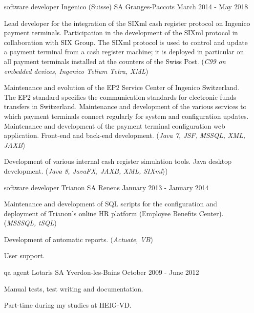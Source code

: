 \begin{cventries}
\cventry
{software developer} %
{Ingenico (Suisse) SA} %
{Granges-Paccots} %
{March 2014 - May 2018} %
{ %
\begin{cvitems}
\item {Lead developer for the integration of the SIXml cash register protocol on Ingenico payment terminals. Participation in the development of the SIXml protocol in collaboration with SIX Group. The SIXml protocol is used to control and update a payment terminal from a cash register machine; it is deployed in particular on all payment terminals installed at the counters of the Swiss Post. (\emph{C99 on embedded devices, Ingenico Telium Tetra, XML})}
\item {Maintenance and evolution of the EP2 Service Center of Ingenico Switzerland. The EP2 standard specifies the communication standards for electronic funds transfers in Switzerland. Maintenance and development of the various services to which payment terminals connect regularly for system and configuration updates. Maintenance and development of the payment terminal configuration web application. Front-end and back-end development. (\emph{Java 7, JSF, MSSQL, XML, JAXB})}
\item {Development of various internal cash register simulation tools. Java desktop development. (\emph{Java 8, JavaFX, JAXB, XML, SIXml}))}
\end{cvitems}
}


\cventry
{software developer} %
{Trianon SA} %
{Renens} %
{January 2013 - January 2014} %
{ %
\begin{cvitems}
\item {Maintenance and development of SQL scripts for the configuration and deployment of Trianon's online HR platform (Employee Benefits Center). (\emph{MSSSQL, tSQL})}
\item {Development of automatic reports. (\emph{Actuate, VB})}
\item {User support.}
\end{cvitems} 
}


\cventry
{qa agent} %
{Lotaris SA} %
{Yverdon-les-Bains} %
{October 2009 - June 2012} %
{ %
\begin{cvitems}
\item {Manual tests, test writing and documentation.}
\item {Part-time during my studies at HEIG-VD.}
\end{cvitems}
}


\end{cventries}
